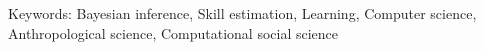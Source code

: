 \documentclass[a4paper,10pt]{book}
\theoremstyle{definition}
\begin{document}
\vspace{0.3cm}

\noindent Keywords: Bayesian inference, Skill estimation, Learning, Computer science, Anthropological science, Computational social science 



\tableofcontents

\newpage 

\vfill
% 
% 
% 
% 
\end{document}
